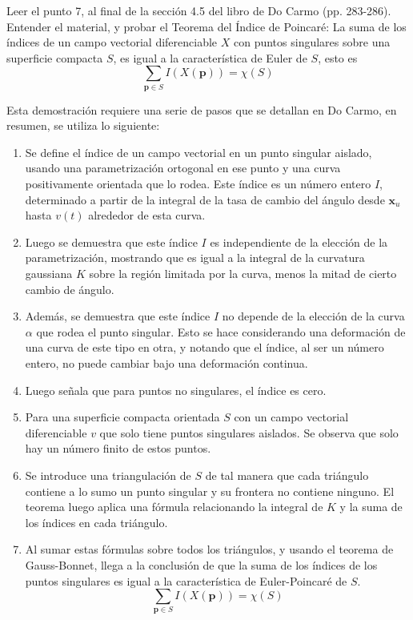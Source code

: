 \begin{problema} Leer el punto 7, al final de la sección 4.5 del libro de Do Carmo (pp. 283-286). Entender el material, y probar el Teorema del Índice de Poincaré:
La suma de los índices de un campo vectorial diferenciable $X$ con puntos singulares sobre una superficie compacta $S$, es igual a la característica de Euler de $S$, esto es
$$
\sum_{\mathbf{p} \in S} I(X(\mathbf{p}))=\chi(S)
$$
\begin{dem}
    Esta demostración requiere una serie de pasos que se detallan en Do Carmo, en resumen, se utiliza lo siguiente: 

    \begin{enumerate}
        \item Se define el índice de un campo vectorial en un punto singular aislado, usando una parametrización ortogonal en ese punto y una curva positivamente orientada que lo rodea. Este índice es un número entero $I$, determinado a partir de la integral de la tasa de cambio del ángulo desde $\mathbf{x}_u$ hasta $v(t)$ alrededor de esta curva.

        \item Luego se demuestra que este índice $I$ es independiente de la elección de la parametrización, mostrando que es igual a la integral de la curvatura gaussiana $K$ sobre la región limitada por la curva, menos la mitad de cierto cambio de ángulo.
        
        \item Además, se demuestra que este índice $I$ no depende de la elección de la curva $\alpha$ que rodea el punto singular. Esto se hace considerando una deformación de una curva de este tipo en otra, y notando que el índice, al ser un número entero, no puede cambiar bajo una deformación continua.
        
        \item Luego señala que para puntos no singulares, el índice es cero.
        
        \item Para una superficie compacta orientada $S$ con un campo vectorial diferenciable $v$ que solo tiene puntos singulares aislados. Se observa que solo hay un número finito de estos puntos.
        
        \item Se introduce una triangulación de $S$ de tal manera que cada triángulo contiene a lo sumo un punto singular y su frontera no contiene ninguno. El teorema luego aplica una fórmula relacionando la integral de $K$ y la suma de los índices en cada triángulo.
        
        \item Al sumar estas fórmulas sobre todos los triángulos, y usando el teorema de Gauss-Bonnet, llega a la conclusión de que la suma de los índices de los puntos singulares es igual a la característica de Euler-Poincaré de $S$.
        $$
\sum_{\mathbf{p} \in S} I(X(\mathbf{p}))=\chi(S)
$$
    \end{enumerate}    
\end{dem}

\end{problema}
%
%

